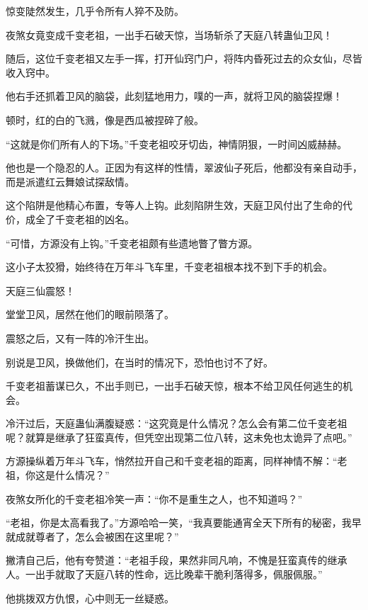 
\begin{this_body}



惊变陡然发生，几乎令所有人猝不及防。

夜煞女竟变成千变老祖，一出手石破天惊，当场斩杀了天庭八转蛊仙卫风！

随后，这位千变老祖又左手一挥，打开仙窍门户，将阵内昏死过去的众女仙，尽皆收入窍中。

他右手还抓着卫风的脑袋，此刻猛地用力，噗的一声，就将卫风的脑袋捏爆！

顿时，红的白的飞溅，像是西瓜被捏碎了般。

“这就是你们所有人的下场。”千变老祖咬牙切齿，神情阴狠，一时间凶威赫赫。

他也是一个隐忍的人。正因为有这样的性情，翠波仙子死后，他都没有亲自动手，而是派遣红云舞娘试探敌情。

这个陷阱是他精心布置，专等人上钩。此刻陷阱生效，天庭卫风付出了生命的代价，成全了千变老祖的凶名。

“可惜，方源没有上钩。”千变老祖颇有些遗地瞥了瞥方源。

这小子太狡猾，始终待在万年斗飞车里，千变老祖根本找不到下手的机会。

天庭三仙震怒！

堂堂卫风，居然在他们的眼前陨落了。

震怒之后，又有一阵的冷汗生出。

别说是卫风，换做他们，在当时的情况下，恐怕也讨不了好。

千变老祖蓄谋已久，不出手则已，一出手石破天惊，根本不给卫风任何逃生的机会。

冷汗过后，天庭蛊仙满腹疑惑：“这究竟是什么情况？怎么会有第二位千变老祖呢？就算是继承了狂蛮真传，但凭空出现第二位八转，这未免也太诡异了点吧。”

方源操纵着万年斗飞车，悄然拉开自己和千变老祖的距离，同样神情不解：“老祖，你这是什么情况？”

夜煞女所化的千变老祖冷笑一声：“你不是重生之人，也不知道吗？”

“老祖，你是太高看我了。”方源哈哈一笑，“我真要能通宵全天下所有的秘密，我早就成就尊者了，怎么会被困在这里呢？”

撇清自己后，他有夸赞道：“老祖手段，果然非同凡响，不愧是狂蛮真传的继承人。一出手就取了天庭八转的性命，远比晚辈干脆利落得多，佩服佩服。”

他挑拨双方仇恨，心中则无一丝疑惑。


\end{this_body}
